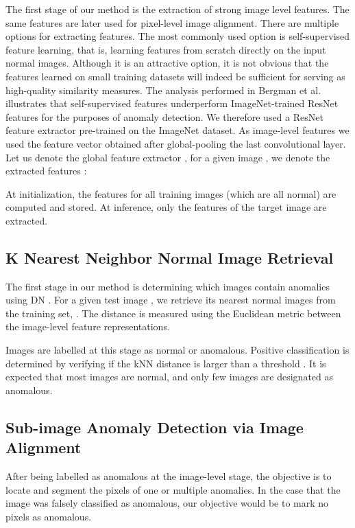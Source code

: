 \documentclass[runningheads]{llncs}
\begin{document}
The first stage of our method is the extraction of strong image level features. The same features are later used for pixel-level image alignment. There are multiple options for extracting features. The most commonly used option is self-supervised feature learning, that is, learning features from scratch directly on the input normal images. Although it is an attractive option, it is not obvious that the features learned on small training datasets will indeed be sufficient for serving as high-quality similarity measures. The analysis performed in Bergman et al. \cite{bergman2020classification} illustrates that self-supervised features underperform ImageNet-trained ResNet features for the purposes of anomaly detection. We therefore used a ResNet feature extractor pre-trained on the ImageNet dataset. As image-level features we used the feature vector obtained after global-pooling the last convolutional layer. Let us denote the global feature extractor , for a given image , we denote the extracted features :



At initialization, the features for all training images (which are all normal) are computed and stored. At inference, only the features of the target image are extracted. 

\subsection{K Nearest Neighbor Normal Image Retrieval} 
\label{sec:method:retrieval} 

The first stage in our method is determining which images contain anomalies using DN \cite{bergman2020classification}. For a given test image , we retrieve its  nearest normal images from the training set, . The distance is measured using the Euclidean metric between the image-level feature representations.



Images are labelled at this stage as normal or anomalous. Positive classification is determined by verifying if the kNN distance is larger than a threshold . It is expected that most images are normal, and only few images are designated as anomalous.

\subsection{Sub-image Anomaly Detection via Image Alignment} 
\label{sec:method:alignment} 

After being labelled as anomalous at the image-level stage, the objective is to locate and segment the pixels of one or multiple anomalies. In the case that the image was falsely classified as anomalous, our objective would be to mark no pixels as anomalous.
\end{document}
